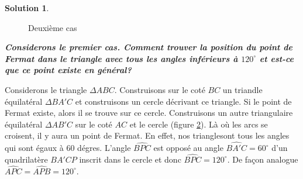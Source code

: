\documentclass[10pt,a4paper]{article}%
\theoremstyle{theorem}
\theoremstyle{definition}
\newtheorem*{solution*}{Solution}
\begin{document}
\begin{solution*}
\begin{figure}[h]
			\begin{center}
			\end{center}
			\caption{Deuxième cas}\label{2cas}
			\end{figure}
			
			\textbf{\textit{Considerons le premier cas. Comment trouver la position du point de Fermat dans le triangle avec tous les angles inférieurs à $120^\circ$ et est-ce que ce point existe en général?}}
			
			Considerons le triangle $\Delta ABC$. Construisons sur le coté $BC$ un triandle équilatéral $\Delta BA'C$ et construisons un cercle décrivant ce triangle. Si le point de Fermat existe, alors il se trouve sur ce cercle. Construisons un autre triangulaire équilatéral $\Delta AB'C$ sur le coté $AC$ et le cercle (figure \ref{exist}). Là où les arcs se croisent, il y aura un point de Fermat. En effet, nos trianglesont tous les angles qui sont égaux à 60  dégres. L'angle $\widehat{BPC}$ est opposé au angle $\widehat{BA'C}=60^\circ$ d'un quadrilatère $BA'CP$ inscrit dans le cercle et donc $\widehat{BPC}=120^\circ$. De façon analogue $\widehat{APC}=\widehat{APB}=120^\circ$.
			
			\begin{figure}[h]
				\begin{center}
				\end{center}
			\caption{}\label{exist}
			\end{figure}
			

\end{solution*}
\end{document}
